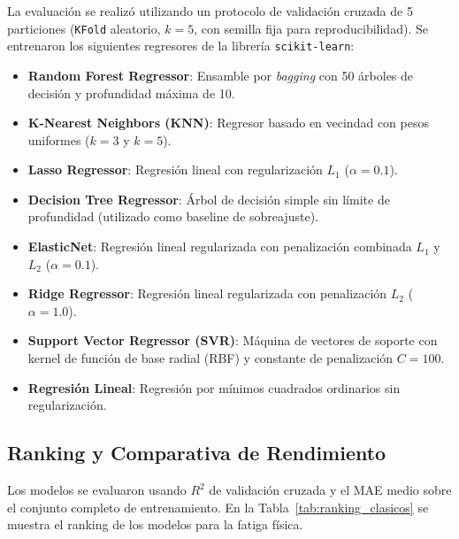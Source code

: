 \documentclass[12pt, a4paper]{article}
\newcommand{\code}[1]{\texttt{#1}}
\begin{document}
La evaluación se realizó utilizando un protocolo de validación cruzada de 5 particiones (\code{KFold} aleatorio, $k=5$, con semilla fija para reproducibilidad). Se entrenaron los siguientes regresores de la librería \code{scikit-learn}:
\begin{itemize}
    \item \textbf{Random Forest Regressor}: Ensamble por \textit{bagging} con 50 árboles de decisión y profundidad máxima de 10.
    \item \textbf{K-Nearest Neighbors (KNN)}: Regresor basado en vecindad con pesos uniformes ($k=3$ y $k=5$).
    \item \textbf{Lasso Regressor}: Regresión lineal con regularización $L_1$ ($\alpha=0.1$).
    \item \textbf{Decision Tree Regressor}: Árbol de decisión simple sin límite de profundidad (utilizado como baseline de sobreajuste).
    \item \textbf{ElasticNet}: Regresión lineal regularizada con penalización combinada $L_1$ y $L_2$ ($\alpha=0.1$).
    \item \textbf{Ridge Regressor}: Regresión lineal regularizada con penalización $L_2$ ($\alpha=1.0$).
    \item \textbf{Support Vector Regressor (SVR)}: Máquina de vectores de soporte con kernel de función de base radial (RBF) y constante de penalización $C=100$.
    \item \textbf{Regresión Lineal}: Regresión por mínimos cuadrados ordinarios sin regularización.
\end{itemize}

\subsection{Ranking y Comparativa de Rendimiento}

Los modelos se evaluaron usando $R^2$ de validación cruzada y el MAE medio sobre el conjunto completo de entrenamiento. En la Tabla~\ref{tab:ranking_clasicos} se muestra el ranking de los modelos para la fatiga física.
\end{document}
